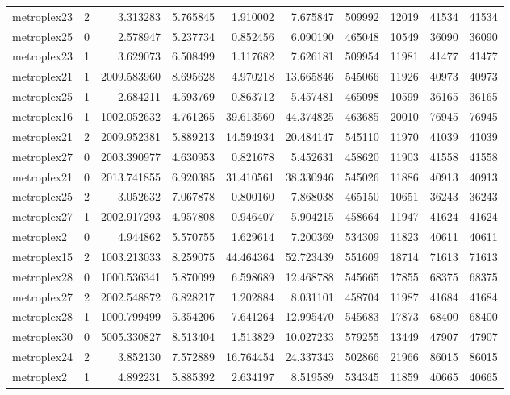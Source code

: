 \begin{longtable}{|l|r|r|r|r|r|r|r|r|r|}
metroplex23 & 2 & 3.313283 & 5.765845 & 1.910002 & 7.675847 & 509992 & 12019 & 41534 & 41534 \\
metroplex25 & 0 & 2.578947 & 5.237734 & 0.852456 & 6.090190 & 465048 & 10549 & 36090 & 36090 \\
metroplex23 & 1 & 3.629073 & 6.508499 & 1.117682 & 7.626181 & 509954 & 11981 & 41477 & 41477 \\
metroplex21 & 1 & 2009.583960 & 8.695628 & 4.970218 & 13.665846 & 545066 & 11926 & 40973 & 40973 \\
metroplex25 & 1 & 2.684211 & 4.593769 & 0.863712 & 5.457481 & 465098 & 10599 & 36165 & 36165 \\
metroplex16 & 1 & 1002.052632 & 4.761265 & 39.613560 & 44.374825 & 463685 & 20010 & 76945 & 76945 \\
metroplex21 & 2 & 2009.952381 & 5.889213 & 14.594934 & 20.484147 & 545110 & 11970 & 41039 & 41039 \\
metroplex27 & 0 & 2003.390977 & 4.630953 & 0.821678 & 5.452631 & 458620 & 11903 & 41558 & 41558 \\
metroplex21 & 0 & 2013.741855 & 6.920385 & 31.410561 & 38.330946 & 545026 & 11886 & 40913 & 40913 \\
metroplex25 & 2 & 3.052632 & 7.067878 & 0.800160 & 7.868038 & 465150 & 10651 & 36243 & 36243 \\
metroplex27 & 1 & 2002.917293 & 4.957808 & 0.946407 & 5.904215 & 458664 & 11947 & 41624 & 41624 \\
metroplex2 & 0 & 4.944862 & 5.570755 & 1.629614 & 7.200369 & 534309 & 11823 & 40611 & 40611 \\
metroplex15 & 2 & 1003.213033 & 8.259075 & 44.464364 & 52.723439 & 551609 & 18714 & 71613 & 71613 \\
metroplex28 & 0 & 1000.536341 & 5.870099 & 6.598689 & 12.468788 & 545665 & 17855 & 68375 & 68375 \\
metroplex27 & 2 & 2002.548872 & 6.828217 & 1.202884 & 8.031101 & 458704 & 11987 & 41684 & 41684 \\
metroplex28 & 1 & 1000.799499 & 5.354206 & 7.641264 & 12.995470 & 545683 & 17873 & 68400 & 68400 \\
metroplex30 & 0 & 5005.330827 & 8.513404 & 1.513829 & 10.027233 & 579255 & 13449 & 47907 & 47907 \\
metroplex24 & 2 & 3.852130 & 7.572889 & 16.764454 & 24.337343 & 502866 & 21966 & 86015 & 86015 \\
metroplex2 & 1 & 4.892231 & 5.885392 & 2.634197 & 8.519589 & 534345 & 11859 & 40665 & 40665 \\

\end{longtable}
